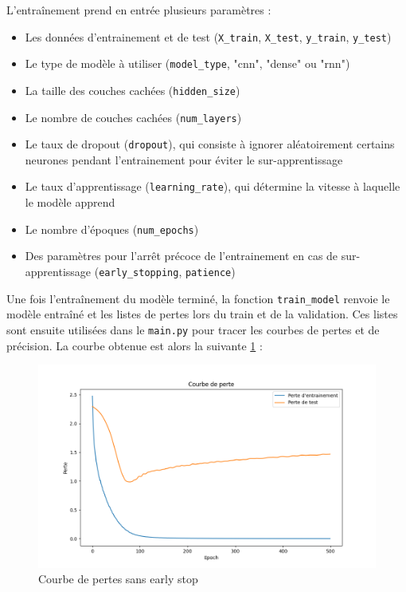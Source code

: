 \documentclass{article}
\begin{document}
L'entraînement prend en entrée plusieurs paramètres :

\begin{itemize}
    \item Les données d'entrainement et de test (\texttt{X\_train}, \texttt{X\_test}, \texttt{y\_train}, \texttt{y\_test})
    \item Le type de modèle à utiliser (\texttt{model\_type}, "cnn", "dense" ou "rnn")
    \item La taille des couches cachées (\texttt{hidden\_size})
    \item Le nombre de couches cachées (\texttt{num\_layers})
    \item Le taux de dropout (\texttt{dropout}), qui consiste à ignorer aléatoirement certains neurones pendant l'entrainement pour éviter le sur-apprentissage
    \item Le taux d'apprentissage (\texttt{learning\_rate}), qui détermine la vitesse à laquelle le modèle apprend
    \item Le nombre d'époques (\texttt{num\_epochs})
    \item Des paramètres pour l'arrêt précoce de l'entrainement en cas de sur-apprentissage (\texttt{early\_stopping}, \texttt{patience})
\end{itemize}

Une fois l'entraînement du modèle terminé, la fonction \texttt{train\_model} renvoie le modèle entraîné et les listes de pertes lors du train et de la validation. Ces listes sont ensuite utilisées dans le \texttt{main.py} pour tracer les courbes de pertes et de précision. La courbe obtenue est alors la suivante \ref{fig:loss_without_early_stop} :

\newpage

\begin{figure}[h!]
    \centering
    \includegraphics[width=\textwidth]{img/loss_curve_without_early_stop.png}
    \caption{Courbe de pertes sans early stop}
    \label{fig:loss_without_early_stop}
\end{figure}
\end{document}

